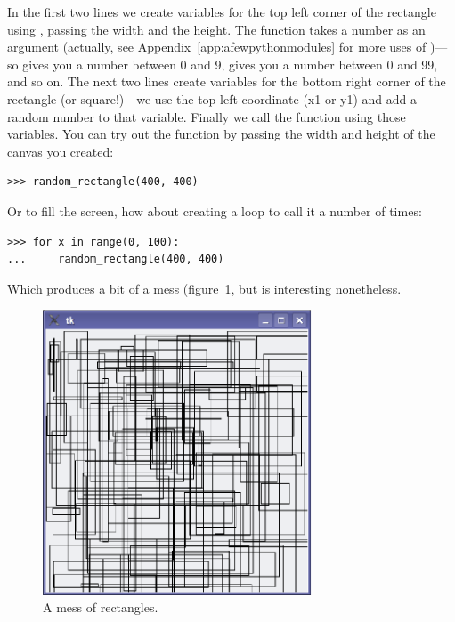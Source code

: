 In the first two lines we create variables for the top left corner of the rectangle using , passing the width and the height.  The  function takes a number as an argument (actually, see Appendix~\ref{app:afewpythonmodules} for more uses of )---so  gives you a number between 0 and 9,  gives you a number between 0 and 99, and so on. The next two lines create variables for the bottom right corner of the rectangle (or square!)---we use the top left coordinate (x1 or y1) and add a random number to that variable. Finally we call the  function using those variables. You can try out the  function by passing the width and height of the canvas you created:

\begin{listing}
\begin{verbatim}
>>> random_rectangle(400, 400)
\end{verbatim}
\end{listing}

\noindent
Or to fill the screen, how about creating a loop to call it a number of times:

\begin{listing}
\begin{verbatim}
>>> for x in range(0, 100):
...     random_rectangle(400, 400)
\end{verbatim}
\end{listing}

\noindent
Which produces a bit of a mess (figure~\ref{fig34}, but is interesting nonetheless.

\begin{figure}
\begin{center}
\includegraphics[width=80mm]{eps/figure34.eps}
\end{center}
\caption{A mess of rectangles.}\label{fig34}
\end{figure}

